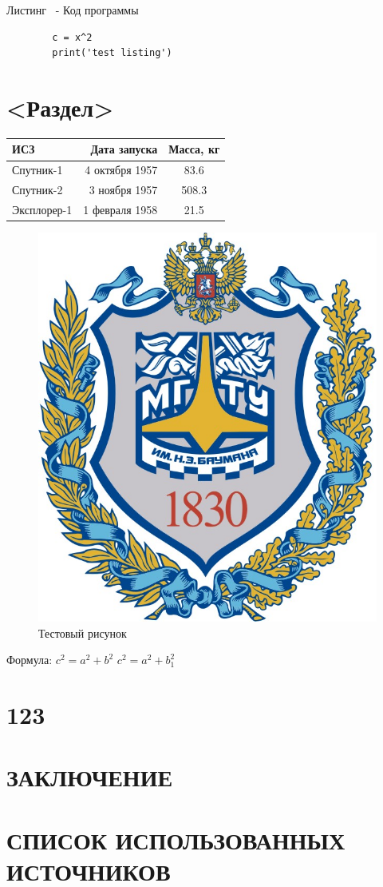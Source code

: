 \documentclass[14pt]{templateReportBMSTU}
\begin{document}
	Листинг \thenumberlisting \ - Код программы
	\begin{lstlisting}
		c = x^2
		print('test listing')
	\end{lstlisting}
	\pagebreak

	\section{<Раздел>}  \label{section1}

	\begin{tabular}{ | p{100pt} | r | c | }
		\hline
		ИСЗ & Дата запуска & Масса, кг  \\ \hline
		Спутник-1 & 4 октября 1957 & 83.6 \\
		Спутник-2 & 3 ноября 1957 & 508.3 \\
		Эксплорер-1 & 1 февраля 1958 & 21.5 \\
		\hline
	\end{tabular}

	\begin{figure}[h]
		\centering
		\includegraphics[width=0.5\linewidth]{1.png}
		\caption{Тестовый рисунок}
		\label{fig:mpr}
	\end{figure}
	
	Формула: $c^{2}=a^{2}+b^{2}$
	\begin{math}
		c^2 = a^2 + b_1^2
	\end{math}
		\pagebreak
	
	\section{123}
		\pagebreak

	\section*{ЗАКЛЮЧЕНИЕ}

		\pagebreak

	\section*{СПИСОК ИСПОЛЬЗОВАННЫХ ИСТОЧНИКОВ}

		\pagebreak
\end{document}

